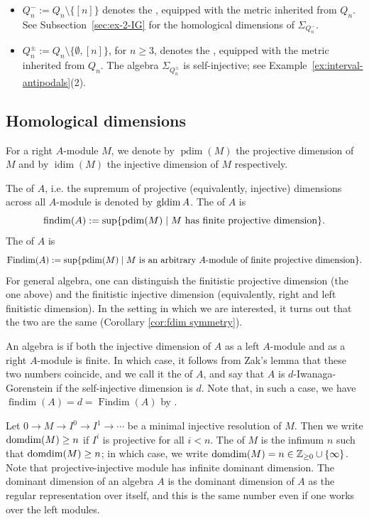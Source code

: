 \documentclass[a4paper,leqno]{amsart}
\begin{document}
\begin{itemize}
    \item $Q_n^-:=Q_n\setminus\{[n]\}$ denotes the
    , equipped with
    the metric inherited from $Q_n$.
    See Subsection~\ref{sec:ex-2-IG} for the homological
    dimensions of $\Sigma_{Q_n^-}$.

    \item $Q_n^\pm:=Q_n\setminus\{\emptyset,[n]\}$, for $n\geq3$,
    denotes the ,
    equipped with the metric inherited from $Q_n$.
    The algebra $\Sigma_{Q_n^\pm}$ is self-injective; see
    Example~\ref{ex:interval-antipodals}(2).
\end{itemize}

\subsection{Homological dimensions}\label{subsec:def-homo-dim}

For a right $A$-module $M$, we denote by $\operatorname{pdim}(M)$ the projective dimension of $M$ and by $\operatorname{idim}(M)$ the injective dimension of $M$ respectively.

The  of $A$, i.e. the supremum of projective (equivalently, injective) dimensions across all $A$-module is denoted by $\operatorname{gldim} A$.
The  of $A$ is 
\[
\operatorname{findim}(A):=\sup \{ \operatorname{pdim}(M) \mid M \text{ has finite projective dimension} \}.
\]
The  of \(A\) is
$$\operatorname{Findim}(A)
:=\sup\{\operatorname{pdim}(M)\mid M \text{ is an arbitrary \(A\)-module of finite projective dimension}\}.$$
For general algebra, one can distinguish the  finitistic projective dimension (the one above) and the finitistic injective dimension (equivalently, right and left finitistic dimension).  In the setting in which we are interested, it turns out that the two are the same (Corollary \ref{cor:fdim symmetry}).

An algebra is  if both the injective dimension of $A$ as a left $A$-module and as a right $A$-module is finite.  In which case, it follows from Zak's lemma that these two numbers coincide, and we call it the  of $A$, and say that $A$ is $d$-Iwanaga-Gorenstein if the self-injective dimension is $d$.  Note that, in such a case, we have
$\operatorname{findim}(A)
=d=
\operatorname{Findim}(A)$
by \cite[Theorem~3.2]{AHHT}.

Let $0\to M\to I^0 \to I^1 \to \cdots$ be a minimal injective resolution of $M$.  Then we write $\operatorname{domdim}(M)\ge n$ if $I^i$ is projective for all $i<n$.  The  of $M$ is the infimum $n$ such that $\operatorname{domdim}(M)\ge n$; in which case, we write $\operatorname{domdim}(M)=n\in \mathbb{Z}_{\ge 0}\cup \{\infty\}$.  Note that projective-injective module has infinite dominant dimension.
The dominant dimension of an algebra $A$ is the dominant dimension of $A$ as the regular representation over itself, and this is the same number even if one works over the left modules.
\end{document}
